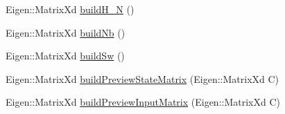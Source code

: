 \begin{DoxyCompactItemize}
\item 
\-Eigen\-::\-Matrix\-Xd \hyperlink{classMIQPController_a23fd21a89ad9ab428e755d21446fb74f}{build\-H\-\_\-\-N} ()
\item 
\-Eigen\-::\-Matrix\-Xd \hyperlink{classMIQPController_a11aaff8d3db3e697bd649bac4f1adf66}{build\-Nb} ()
\item 
\-Eigen\-::\-Matrix\-Xd \hyperlink{classMIQPController_af6d64cb5092ee467b9f460e0282abbff}{build\-Sw} ()
\item 
\-Eigen\-::\-Matrix\-Xd \hyperlink{classMIQPController_a7bdaa8d0926aab427e8572e44bfbd643}{build\-Preview\-State\-Matrix} (\-Eigen\-::\-Matrix\-Xd \-C)
\item 
\-Eigen\-::\-Matrix\-Xd \hyperlink{classMIQPController_a2d71a4c6d2b1898293cccc9dcea94412}{build\-Preview\-Input\-Matrix} (\-Eigen\-::\-Matrix\-Xd \-C)
\end{DoxyCompactItemize}
